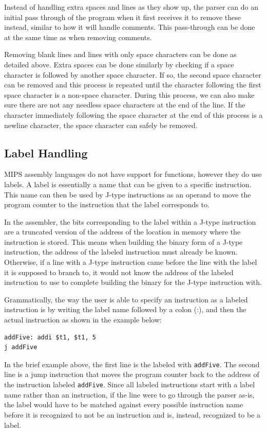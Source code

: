 \documentclass[
    paper=letter,
    parskip=half,
    fontsize=12pt,
    titlepage=firstiscover,
    toc=bibliography,
    numbers=endperiod
]{scrartcl}
\begin{document}
Instead of handling extra spaces and lines as they show up, the parser
can do an initial pass through of the program when it first receives it
to remove these instead, similar to how it will handle comments. This
pass-through can be done at the same time as when removing comments.

Removing blank lines and lines with only space characters can be done as
detailed above. Extra spaces can be done similarly by checking if a
space character is followed by another space character. If so, the
second space character can be removed and this process is repeated until
the character following the first space character is a non-space
character. During this process, we can also make sure there are not any
needless space characters at the end of the line. If the character
immediately following the space character at the end of this process is
a newline character, the space character can safely be removed.

\subsection{Label Handling}

MIPS assembly languages do not have support for functions, however they
do use labels. A label is essentially a name that can be given to a
specific instruction. This name can then be used by J-type instructions
as an operand to move the program counter to the instruction that the
label corresponds to.

In the assembler, the bits corresponding to the label within a J-type
instruction are a truncated version of the address of the location in
memory where the instruction is stored. This means when building the
binary form of a J-type instruction, the address of the labeled
instruction must already be known. Otherwise, if a line with a J-type
instruction came before the line with the label it is supposed to branch
to, it would not know the address of the labeled instruction to use to
complete building the binary for the J-type instruction with.

Grammatically, the way the user is able to specify an instruction as a
labeled instruction is by writing the label name followed by a colon
(:), and then the actual instruction as shown in the example below:

\begin{verbatim}
addFive: addi $t1, $t1, 5
j addFive
\end{verbatim}

In the brief example above, the first line is the labeled with
\texttt{addFive}. The second line is a jump instruction that moves the
program counter back to the address of the instruction labeled
\texttt{addFive}. Since all labeled instructions start with a label name
rather than an instruction, if the line were to go through the parser
as-is, the label would have to be matched against every possible
instruction name before it is recognized to not be an instruction and
is, instead, recognized to be a label.
\end{document}
